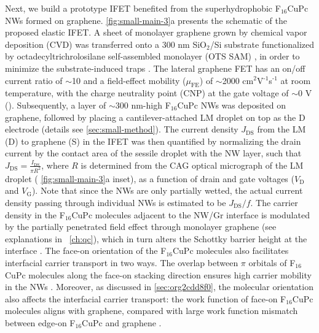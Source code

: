 Next, we build a prototype IFET benefited from the superhydrophobic
F$_{16}$CuPc NWs formed on graphene.
\autoref{fig:small-main-3}a presents the
schematic of the proposed elastic IFET.
%
A sheet of monolayer graphene grown by chemical vapor deposition (CVD)
was transferred onto a 300 nm SiO\(_{\text{2}}\)/Si substrate
functionalized by octadecyltrichrolosilane self-assembled monolayer
(OTS SAM) \cite{Yan_2011}, in order to minimize the substrate-induced
traps \cite{Wang_2011_quanti_doping_gr}.  The lateral graphene FET has
an on/off current ratio of \(\sim\)10 and a field-effect mobility
(\(\mu_{\mathrm{FE}}\)) of \(\sim\)2000
cm\(^{\text{2}}\)V\(^{\text{-1}}\)s\(^{\text{-1}}\) at room
temperature, with the charge neutrality point (CNP) at the gate
voltage of \(\sim\)0 V (). Subsequently, a layer of \(\sim\)300 nm-high
F\(_{\text{16}}\)CuPc NWs was deposited on graphene, followed by
placing a cantilever-attached LM droplet on top as the D electrode
(details see \autoref{sec:small-method}).
%
The current density \(J_{\mathrm{DS}}\) from the LM (D) to graphene
(S) in the IFET was then quantified by normalizing the drain current
by the contact area of the sessile droplet with the NW layer, such
that
\(J_{\mathrm{DS}} = {\displaystyle \frac{I_{\mathrm{DS}}}{\pi
    R^{2}}}\), where \(R\) is determined from the CAG optical
micrograph of the LM droplet ( \autoref{fig:small-main-3}a inset), as
a function of drain and gate voltages (\(V_{\mathrm{D}}\) and
\(V_{\mathrm{G}}\)). Note that since the NWs are only partially
wetted, the actual current density passing through individual NWs is
estimated to be \(J_{\mathrm{DS}}/f\). The carrier density in the
F\(_{\text{16}}\)CuPc molecules adjacent to the NW/Gr interface is
modulated by the partially penetrated field effect through monolayer
graphene (see explanations in ~\autoref{ch:qc}), which in turn alters
the Schottky barrier height at the interface
\cite{Yang_2012_Barristor}.
%
The face-on orientation of the F\(_{\text{16}}\)CuPc molecules also
facilitates interfacial carrier transport in two ways. The overlap
between \(\pi\) orbitals of F\(_{\text{16}}\)CuPc molecules along the
face-on stacking direction ensures high carrier mobility in the NWs
\cite{Bao_1998_FCuPC}.
%
Moreover, as discussed in \autoref{sec:org2cdd8f0}, the molecular
orientation also affects the interfacial carrier transport: the work
function of face-on F\(_{\text{16}}\)CuPc molecules aligns with
graphene, compared with large work function mismatch between edge-on
F\(_{\text{16}}\)CuPc and graphene
\cite{Mao_2010_F16_level_orien,Ren_2011_DFT_CuPc_epi_gr}.
